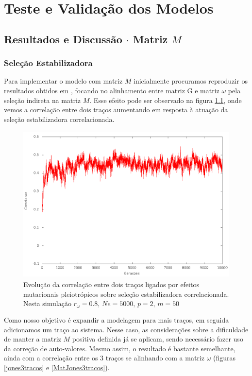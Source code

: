 \pagestyle{empty}
\cleardoublepage
\pagestyle{fancy}
\chapter{Teste e Validação dos Modelos}\label{cap3}

\section{Resultados e Discussão $\cdot$ Matriz $M$}\label{cap3:ModelM}

\subsection{Seleção Estabilizadora}

Para implementar o modelo com matriz $M$ inicialmente procuramos
reproduzir os resultados obtidos em \cite{Jones2007}, focando no
alinhamento entre matriz G e matriz $\omega$ pela seleção indireta na
matriz $M$. Esse efeito pode ser observado na figura \ref{jones2tracos},
onde vemos a correlação entre dois traços aumentando em resposta à
atuação da seleção estabilizadora correlacionada.  

\begin{center}
\begin{figure}[htbp]
  \includegraphics[width=150mm, height=80mm]{figuras/jones2tracos.png}
  \caption{Evolução da correlação entre dois traços ligados por efeitos
  mutacionais pleiotrópicos sobre seleção estabilizadora correlacionada.
  Nesta simulação $r_\omega=0.8$, $Ne=5000$, $p=2$, $m=50$}
  \label{jones2tracos}
\end{figure}
\end{center}

Como nosso objetivo é expandir a modelagem para mais traços, em seguida
adicionamos um traço ao sistema. Nesse caso, as considerações sobre a
dificuldade de manter a matriz $M$ positiva definida já se aplicam,
sendo necessário fazer uso da correção de auto-valores. Mesmo assim, o
resultado é bastante semelhante, ainda com a correlação entre os 3 traços
se alinhando com a matriz $\omega$ (figuras
\ref{jones3tracos} e \ref{MatJones3tracos}). 


